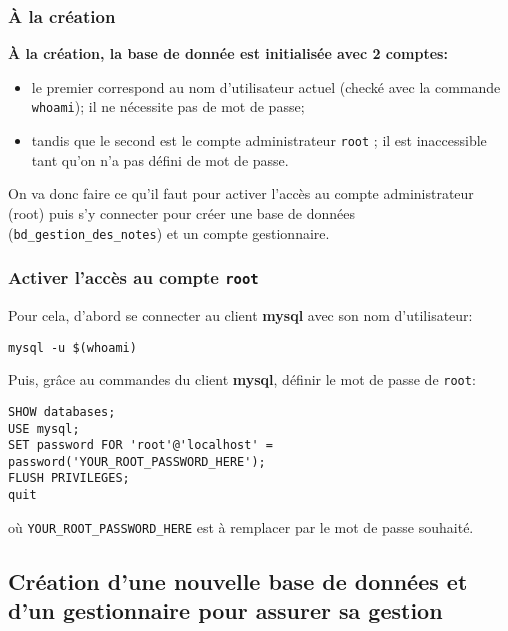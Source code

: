 \documentclass[11pt]{article}
\begin{document}
\subsubsection{À la création}
\label{sec:org74936f6}

\textbf{À la création, la base de donnée est initialisée avec 2 comptes:} 
\begin{itemize}
\item le premier correspond au nom d'utilisateur actuel (checké avec la commande \texttt{whoami}); il ne nécessite pas de mot de passe;
\item tandis que le second est le compte administrateur \texttt{root} ; il est inaccessible tant qu'on n'a pas défini de mot de passe.
\end{itemize}

On va donc faire ce qu'il faut pour activer l'accès au compte administrateur (root) puis s'y connecter pour créer une base de données (\texttt{bd\_gestion\_des\_notes}) et un compte gestionnaire.  

\subsubsection{Activer l'accès au compte \texttt{root}}
\label{sec:orge6bd3c4}

Pour cela, d'abord se connecter au client \textbf{mysql}  avec son nom d'utilisateur:

\begin{verbatim}
mysql -u $(whoami)
\end{verbatim}

Puis, grâce au commandes du client \textbf{mysql}, définir le mot de passe de \texttt{root}:

\begin{verbatim}
SHOW databases;
USE mysql;
SET password FOR 'root'@'localhost' = 
password('YOUR_ROOT_PASSWORD_HERE');
FLUSH PRIVILEGES;
quit
\end{verbatim}

où \texttt{YOUR\_ROOT\_PASSWORD\_HERE} est à remplacer par le mot de passe souhaité.

\subsection{Création d'une nouvelle base de données et d'un gestionnaire pour assurer sa gestion}
\label{sec:org28adc5e}
\end{document}
